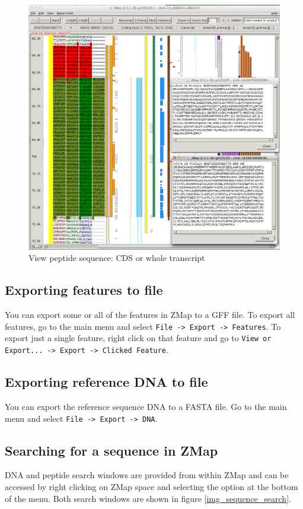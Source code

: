 \documentclass[letterpaper]{article}
\begin{document}
\begin{figure}
\centering
\color[rgb]{0.30980393,0.5058824,0.7411765}
\includegraphics[width=15.231cm]{img_view_peptide.png}
\caption{View peptide sequence: CDS or whole transcript}
\label{img_view_peptide}
\end{figure}


\subsection{Exporting features to file}
You can export some or all of the features in ZMap to a GFF file. To export all features, go to the main menu and select \lstinline{File -> Export -> Features}. To export just a single feature, right click on that feature and go to \lstinline{View or Export... -> Export -> Clicked Feature}.


\subsection{Exporting reference DNA to file}
You can export the reference sequence DNA to a FASTA file. Go to the main menu and select \lstinline{File -> Export -> DNA}. 


\subsection{Searching for a sequence in ZMap}
DNA and peptide search windows are provided from within ZMap and can be accessed by right clicking on ZMap space and selecting the option at the bottom of the menu. Both search windows are shown in figure \ref{img_sequence_search}.
\end{document}
